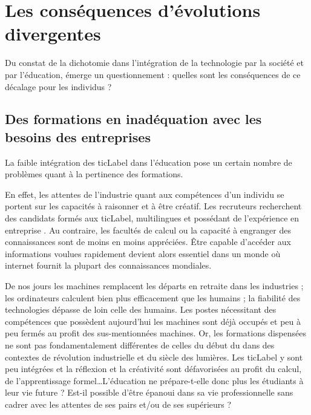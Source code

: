 
\part{Les conséquences d'évolutions divergentes}
Du constat de la dichotomie dans l'intégration de la technologie par la société et par l'éducation, émerge un questionnement : quelles sont les conséquences de ce décalage pour les individus ?



\chapter{Des formations en inadéquation avec les besoins des entreprises}
La faible intégration des \gls{ticLabel} dans l'éducation pose un certain nombre de problèmes quant à la pertinence des formations.

En effet, les attentes de l'industrie quant aux compétences d'un individu se portent sur les capacités à raisonner et à être créatif. Les recruteurs recherchent des candidats formés aux \gls{ticLabel}, multilingues et possédant de l'expérience en entreprise \cite{DRH_criteres}. Au contraire, les facultés de calcul ou la capacité à engranger des connaissances sont de moins en moins appréciées. Être capable d'accéder aux informations voulues rapidement devient alors essentiel dans un monde où internet fournit la plupart des connaissances mondiales.

De nos jours les machines remplacent les départs en retraite dans les industries ; les ordinateurs calculent bien plus efficacement que les humains ; la fiabilité des technologies dépasse de loin celle des humains. Les postes nécessitant des compétences que possèdent aujourd'hui les machines sont déjà occupés et peu à peu fermés au profit des sus-mentionnées machines. Or, les formations dispensées ne sont pas fondamentalement différentes de celles du début du   \cite{robinson2010paradigms} dans des contextes de révolution industrielle et du siècle des lumières. Les \gls{ticLabel} y sont peu intégrées et la réflexion et la créativité sont défavorisées au profit du calcul, de l'apprentissage formel\ldots L'éducation ne prépare-t-elle donc plus les étudiants à leur vie future \cite{formation_recrutement} ? Est-il possible d'être épanoui dans sa vie professionnelle sans cadrer avec les attentes de ses pairs et/ou de ses supérieurs ?

